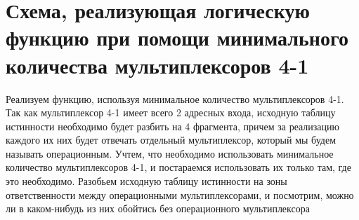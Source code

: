 \documentclass{mirea}
\begin{document}
\section{Схема, реализующая логическую функцию при помощи минимального количества мультиплексоров 4-1}
Реализуем функцию, используя минимальное количество мультиплексоров 4-1. Так как мультиплексор 4-1 имеет всего 2 адресных входа, исходную таблицу истинности необходимо будет разбить на 4 фрагмента, причем за реализацию каждого их них будет отвечать отдельный мультиплексор, который мы будем называть операционным. Учтем, что необходимо использовать минимальное количество мультиплексоров 4-1, и постараемся использовать их только там, где это необходимо. Разобьем исходную таблицу истинности на зоны ответственности между операционными мультиплексорами, и посмотрим, можно ли в каком-нибудь из них обойтись без операционного мультиплексора
\end{document}
